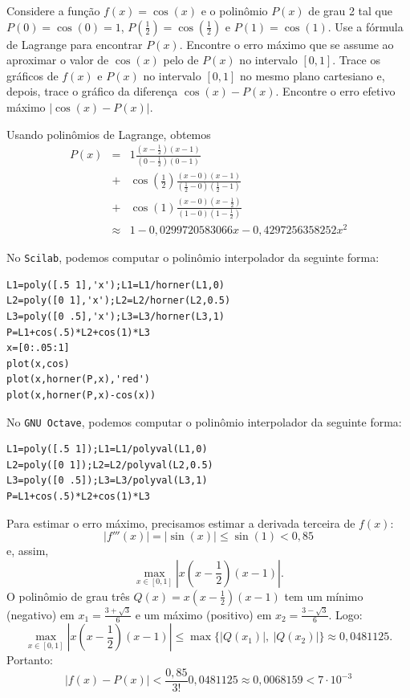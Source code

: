 \begin{ex}
Considere a função $f(x)=\cos(x)$ e o polinômio $P(x)$ de grau 2 tal que $P(0)=\cos(0)=1$, $P(\frac{1}{2})=\cos(\frac{1}{2})$ e $P(1)=\cos(1)$. Use a fórmula de Lagrange para encontrar $P(x)$. Encontre o erro máximo que se assume ao aproximar o valor de $\cos(x)$ pelo de $P(x)$ no intervalo $[0,1]$. Trace os gráficos de $f(x)$ e $P(x)$ no intervalo $[0,1]$ no mesmo plano cartesiano e, depois, trace o gráfico da diferença $\cos(x)-P(x)$. Encontre o erro efetivo máximo $|\cos(x)-P(x)|$.
\end{ex}
\begin{sol}
  Usando polinômios de Lagrange, obtemos
  \begin{eqnarray}
    P(x) &=& 1\frac{(x-\frac{1}{2})(x-1)}{(0-\frac{1}{2})(0-1)}\nonumber\\
         &+& \cos\left(\frac{1}{2}\right)\frac{(x-0)(x-1)}{(\frac{1}{2}-0)(\frac{1}{2}-1)}\nonumber\\
         &+& \cos(1)\frac{(x-0)(x-\frac{1}{2})}{(1-0)(1-\frac{1}{2})}\\
         &\approx&   1 - 0,0299720583066x - 0,4297256358252x^2
  \end{eqnarray}

\ifisscilab
No \verb+Scilab+, podemos computar o polinômio interpolador da seguinte forma:
\begin{verbatim}
L1=poly([.5 1],'x');L1=L1/horner(L1,0)
L2=poly([0 1],'x');L2=L2/horner(L2,0.5)
L3=poly([0 .5],'x');L3=L3/horner(L3,1)
P=L1+cos(.5)*L2+cos(1)*L3
x=[0:.05:1]
plot(x,cos)
plot(x,horner(P,x),'red')
plot(x,horner(P,x)-cos(x))
\end{verbatim}
\fi
\ifisoctave
No \verb+GNU Octave+, podemos computar o polinômio interpolador da seguinte forma:
\begin{verbatim}
L1=poly([.5 1]);L1=L1/polyval(L1,0)
L2=poly([0 1]);L2=L2/polyval(L2,0.5)
L3=poly([0 .5]);L3=L3/polyval(L3,1)
P=L1+cos(.5)*L2+cos(1)*L3
\end{verbatim}
\fi
\ifispython
\construirPython
\fi

Para estimar o erro máximo, precisamos estimar a derivada terceira de $f(x)$:
\begin{equation} |f'''(x)|=|\sin(x)|\leq \sin(1)<0,85 \end{equation}
e, assim,
\begin{equation}
\max_{x\in[0,1]} \left|x\left(x-\frac{1}{2}\right)(x-1)\right|.
\end{equation}
O polinômio de grau três $Q(x)=x\left(x-\frac{1}{2}\right)(x-1)$ tem um mínimo (negativo) em $x_1=\frac{3+\sqrt{3}}{6}$ e um máximo (positivo) em $x_2=\frac{3-\sqrt{3}}{6}$. Logo:
\begin{equation}
\max_{x\in[0,1]} \left|x\left(x-\frac{1}{2}\right)(x-1)\right|\leq \max\{|Q(x_1)|,\ |Q(x_2)|\}\approx 0,0481125.
\end{equation}
Portanto:
\begin{equation}
|f(x)-P(x)|< \frac{0,85}{3!}0,0481125\approx 0,0068159<7\cdot 10^{-3}
\end{equation}


\end{sol}
